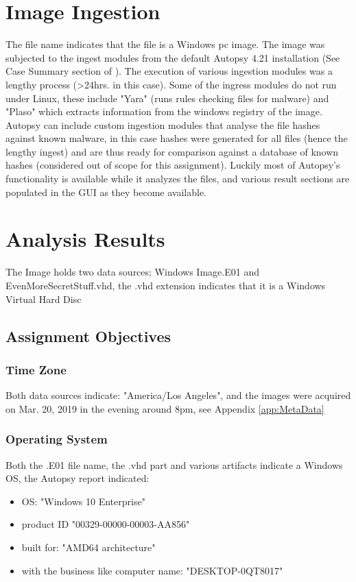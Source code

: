 \documentclass[
	letterpaper, %
	10pt, %
	unnumberedsections, %
	twoside, %
]{APAAssignment}
\begin{document}
\section{Image Ingestion}
The file name indicates that the file is a Windows pc image. The image was subjected to the ingest modules from the default Autopsy 4.21 installation (See Case Summary section of \cite{AutoReport}). The execution of various ingestion modules was a lengthy process (>24hrs. in this case). Some of the ingress modules do not run under Linux, these include "Yara" (runs rules checking files for malware) and "Plaso" which extracts information from the windows registry of the image.
Autopsy can include custom ingestion modules that analyse the file hashes against known malware, in this case hashes were generated for all files (hence the lengthy ingest) and are thus ready for comparison against a database of known hashes (considered out of scope for this assignment). Luckily most of Autopsy's functionality is available while it analyzes the files, and various result sections are populated in the GUI as they become available.

\section{Analysis Results}
The Image holds two data sources; Windows Image.E01 and EvenMoreSecretStuff.vhd, the .vhd extension indicates that it is a Windows Virtual Hard Disc \cite{WindowsVHD}
\subsection{Assignment Objectives}

\subsubsection{Time Zone}
Both data sources indicate: "America/Los Angeles", and the images were acquired on Mar. 20, 2019 in the evening around 8pm, see Appendix \ref{app:MetaData}

\subsubsection{Operating System}
Both the .E01 file name, the .vhd part and various artifacts indicate a Windows OS, the Autopsy report \cite{AutoReport} indicated:

\begin{itemize}
	\item OS: "Windows 10 Enterprise"
	\item product ID "00329-00000-00003-AA856"
	\item built for: "AMD64 architecture"
	\item with the business like computer name: "DESKTOP-0QT8017"
\end{itemize}
\end{document}
